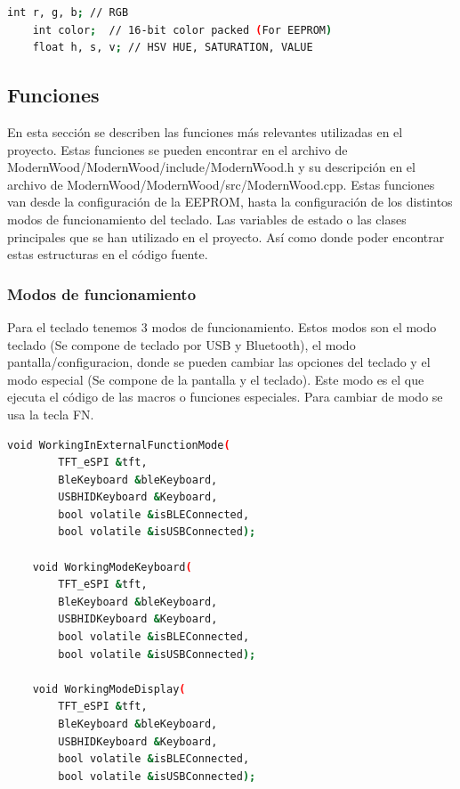 \begin{lstlisting}[style=console, language=bash, caption={Definicion de los 3 datos que maneja la clase RGB}, label={code:RGBClass}]
    int r, g, b; // RGB
    int color;  // 16-bit color packed (For EEPROM)
    float h, s, v; // HSV HUE, SATURATION, VALUE
\end{lstlisting}

\subsection{Funciones}\label{ApendiceFunciones}

En esta sección se describen las funciones más relevantes utilizadas en el proyecto. Estas funciones se pueden encontrar en el archivo de ModernWood/ModernWood/include/ModernWood.h y su descripción en el archivo de ModernWood/ModernWood/src/ModernWood.cpp. Estas funciones van desde la configuración de la \gls{EEPROM}, hasta la configuración de los distintos modos de funcionamiento del teclado. Las variables de estado o las clases principales que se han utilizado en el proyecto. Así como donde poder encontrar estas estructuras en el código fuente.

\subsubsection{Modos de funcionamiento}
Para el teclado tenemos 3 modos de funcionamiento. Estos modos son el modo teclado (Se compone de teclado por \gls{USB} y \gls{Bluetooth}), el modo pantalla/configuracion, donde se pueden cambiar las opciones del teclado y el modo especial (Se compone de la pantalla y el teclado). Este modo es el que ejecuta el código de las macros o funciones especiales. Para cambiar de modo se usa la tecla FN.

\begin{lstlisting}[style=console, language=bash, caption={Funciones principales del teclado ModernWood}, label={code:ConfigStruct}]
    void WorkingInExternalFunctionMode(
        TFT_eSPI &tft,
        BleKeyboard &bleKeyboard,
        USBHIDKeyboard &Keyboard, 
        bool volatile &isBLEConnected, 
        bool volatile &isUSBConnected);

    void WorkingModeKeyboard(
        TFT_eSPI &tft, 
        BleKeyboard &bleKeyboard, 
        USBHIDKeyboard &Keyboard, 
        bool volatile &isBLEConnected, 
        bool volatile &isUSBConnected);
    
    void WorkingModeDisplay(
        TFT_eSPI &tft, 
        BleKeyboard &bleKeyboard, 
        USBHIDKeyboard &Keyboard, 
        bool volatile &isBLEConnected, 
        bool volatile &isUSBConnected);
\end{lstlisting}

